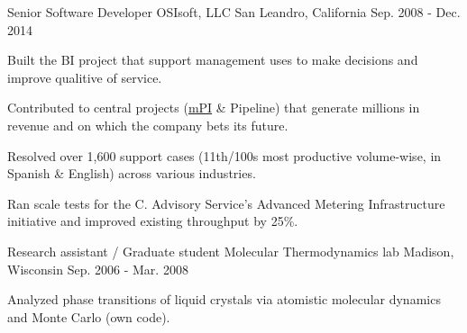 \begin{cventries}
  \cventry
    {Senior Software Developer} %
    {OSIsoft, LLC} %
    {San Leandro, California} %
    {Sep. 2008 - Dec. 2014} %
    {
      \begin{cvitems} %
		\item{Built the BI project that support management uses to make decisions and improve qualitive of service.}
	    \item{Contributed to central projects (\href{http://www.osisoft.com/software-support/ea/Managed_PI.aspx}{mPI} \& Pipeline) that generate millions in revenue and on which the company bets its future.}
		\item{Resolved over 1,600 support cases (11th/100s most productive volume-wise, in Spanish \& English) across various industries.}
		\item{Ran scale tests for the C. Advisory Service's Advanced Metering Infrastructure initiative and improved existing throughput by 25\%.}
      \end{cvitems}
    }

  \cventry
    {Research assistant / Graduate student} %
    {Molecular Thermodynamics lab} %
    {Madison, Wisconsin} %
    {Sep. 2006 - Mar. 2008} %
    {
      \begin{cvitems} %
		  \item {Analyzed phase transitions of liquid crystals via atomistic molecular dynamics and Monte Carlo (own code).}
      \end{cvitems}
    }


\end{cventries}

